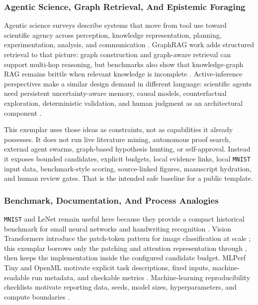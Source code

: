 \documentclass[
]{article}
\begin{document}
\subsubsection{Agentic Science, Graph Retrieval, And Epistemic
Foraging}\label{sec:agentic-science-graph-retrieval}

Agentic science surveys describe systems that move from tool use toward
scientific agency across perception, knowledge representation, planning,
experimentation, analysis, and communication
\citep{wei_agentic_science_2025, gridach_agentic_science_2025}. GraphRAG
work adds structured retrieval to that picture: graph construction and
graph-aware retrieval can support multi-hop reasoning, but benchmarks
also show that knowledge-graph RAG remains brittle when relevant
knowledge is incomplete \citep{graphrag_bench_2026, brink_kg_rag_2026}.
Active-inference perspectives make a similar design demand in different
language: scientific agents need persistent uncertainty-aware memory,
causal models, counterfactual exploration, deterministic validation, and
human judgment as an architectural component
\citep{active_inference_science_2025}.

This exemplar uses those ideas as constraints, not as capabilities it
already possesses. It does not run live literature mining, autonomous
proof search, external agent swarms, graph-based hypothesis hunting, or
self-approval. Instead it exposes bounded candidates, explicit budgets,
local evidence links, local \texttt{MNIST} input data, benchmark-style
scoring, source-linked figures, manuscript hydration, and human review
gates. That is the intended safe baseline for a public template.

\subsubsection{Benchmark, Documentation, And Process
Analogies}\label{sec:benchmark-documentation-process-analogies}

\texttt{MNIST} and LeNet remain useful here because they provide a
compact historical benchmark for small neural networks and handwriting
recognition \citep{lecun_gradient_1998, lecun_mnist_database}. Vision
Transformers introduce the patch-token pattern for image classification
at scale \citep{dosovitskiy_vit_2020}; this exemplar borrows only the
patching and attention representation through
, then keeps the
implementation inside the configured candidate budget. MLPerf Tiny and
OpenML motivate explicit task descriptions, fixed inputs,
machine-readable run metadata, and checkable metrics
\citep{banbury_mlperf_tiny_2021, vanschoren_openml_2014}.
Machine-learning reproducibility checklists motivate reporting data,
seeds, model sizes, hyperparameters, and compute boundaries
\citep{pineau_reproducibility_2020}.
\end{document}
